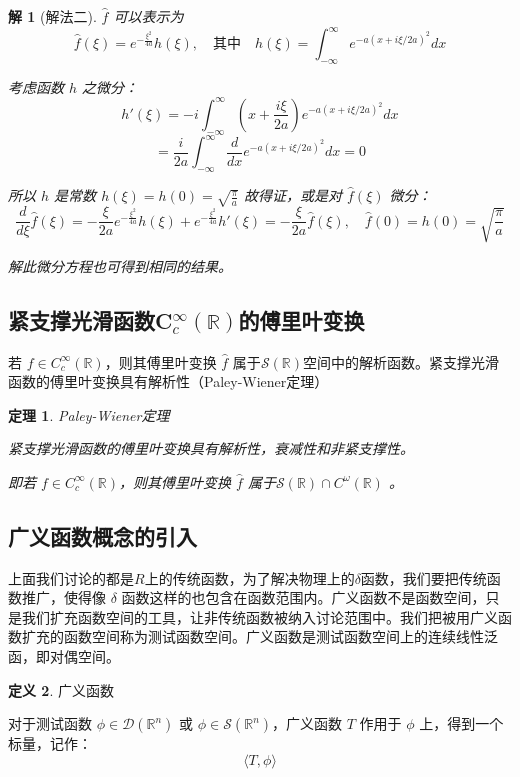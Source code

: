 \documentclass[12pt,a4paper]{article}
\theoremstyle{plain}
\newtheorem{theorem}{定理}[section]
\newtheorem{solution}{解}
\theoremstyle{definition}
\newtheorem{definition}[theorem]{定义}
\theoremstyle{remark}
\begin{document}
\begin{solution}[解法二]
	$\widehat{f}$ 可以表示为
	\[
	\widehat{f}(\xi) = e^{-\frac{\xi^2}{4a}} h(\xi), \quad \text{其中} \quad h(\xi) = \int_{-\infty}^{\infty} e^{-a(x + i\xi/2a)^2} dx
	\]
	
	考虑函数 $h$ 之微分：
	\[
	h'(\xi) = -i \int_{-\infty}^{\infty} \left(x + \frac{i\xi}{2a}\right) e^{-a(x + i\xi/2a)^2} dx
	\]
	\[
	= \frac{i}{2a} \int_{-\infty}^{\infty} \frac{d}{dx} e^{-a(x + i\xi/2a)^2} dx = 0
	\]
	
	所以 $h$ 是常数 $h(\xi) = h(0) = \sqrt{\frac{\pi}{a}}$ 故得证，或是对 $\widehat{f}(\xi)$ 微分：
	\[
	\frac{d}{d\xi} \widehat{f}(\xi) = -\frac{\xi}{2a} e^{-\frac{\xi^2}{4a}} h(\xi) + e^{-\frac{\xi^2}{4a}} h'(\xi) = -\frac{\xi}{2a} \widehat{f}(\xi), \quad \widehat{f}(0) = h(0) = \sqrt{\frac{\pi}{a}}
	\]
	
	解此微分方程也可得到相同的结果。
\end{solution}



\subsection{紧支撑光滑函数C$_c^\infty(\mathbb{R})$的傅里叶变换}
若 $f \in C_c^\infty(\mathbb{R})$，则其傅里叶变换 $\hat{f}$ 属于$\mathcal{S}(\mathbb{R})$空间中的解析函数。紧支撑光滑函数的傅里叶变换具有解析性（Paley-Wiener定理）
\begin{theorem}Paley-Wiener定理
	
	紧支撑光滑函数的傅里叶变换具有解析性，衰减性和非紧支撑性。
	
	即若 $f \in C_c^\infty(\mathbb{R})$，则其傅里叶变换 $\hat{f}$ 属于$\mathcal{S}(\mathbb{R})\cap C^\omega(\mathbb{R})$ 。
	
\end{theorem}




\subsection{广义函数概念的引入}
上面我们讨论的都是$R$上的传统函数，为了解决物理上的$\delta$函数，我们要把传统函数推广，使得像 $\delta$ 函数这样的也包含在函数范围内。广义函数不是函数空间，只是我们扩充函数空间的工具，让非传统函数被纳入讨论范围中。我们把被用广义函数扩充的函数空间称为测试函数空间。广义函数是测试函数空间上的连续线性泛函，即对偶空间。



\begin{definition}广义函数
	
对于测试函数 \(\phi \in \mathcal{D}(\mathbb{R}^n)\) 或 \(\phi \in \mathcal{S}(\mathbb{R}^n)\)，广义函数 \(T\) 作用于 \(\phi\) 上，得到一个标量，记作：
\[
\langle T, \phi \rangle
\]

\end{definition}
\end{document}
